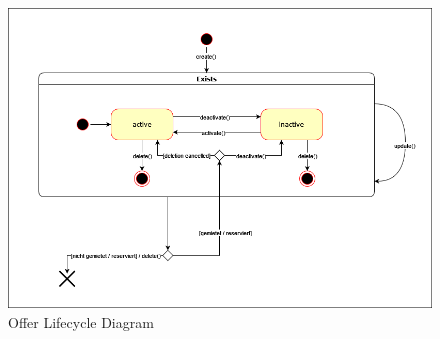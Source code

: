 \begin{figure}[h]
	\centering
	\includegraphics[width=15cm]{resources/images/offer_lifecycle_diagram.png}
	\caption{Offer Lifecycle Diagram}
	\label{fig:offer_lifecycle_diagram}
\end{figure}
